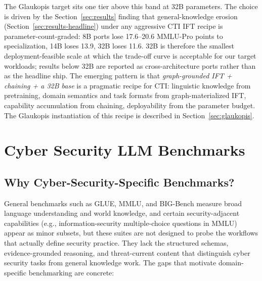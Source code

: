 \documentclass[webpdf,contemporary,large]{oup-authoring-template}
\theoremstyle{thmstyleone}
\theoremstyle{thmstyletwo}
\theoremstyle{thmstylethree}
\begin{document}
The Glaukopis target sits one tier above this band at 32B parameters. The choice is driven by the Section~\ref{sec:results} finding that general-knowledge erosion (Section~\ref{sec:results-headline}) under any aggressive CTI IFT recipe is parameter-count-graded: 8B ports lose 17.6--20.6 MMLU-Pro points to specialization, 14B loses 13.9, 32B loses 11.6. 32B is therefore the smallest deployment-feasible scale at which the trade-off curve is acceptable for our target workloads; results below 32B are reported as cross-architecture ports rather than as the headline ship. The emerging pattern is that \emph{graph-grounded IFT + chaining + a 32B base} is a pragmatic recipe for CTI: linguistic knowledge from pretraining, domain semantics and task formats from graph-materialized IFT, capability accumulation from chaining, deployability from the parameter budget. The Glaukopis instantiation of this recipe is described in Section~\ref{sec:glaukopis}.


\section{Cyber Security LLM Benchmarks}
\label{sec:benchmarks}

\subsection{Why Cyber-Security-Specific Benchmarks?}

General benchmarks such as GLUE, MMLU, and BIG-Bench measure broad language understanding and world knowledge, and certain security-adjacent capabilities (e.g., information-security multiple-choice questions in MMLU) appear as minor subsets, but these suites are not designed to probe the workflows that actually define security practice. They lack the structured schemas, evidence-grounded reasoning, and threat-current content that distinguish cyber security tasks from general knowledge work. The gaps that motivate domain-specific benchmarking are concrete:
\end{document}
